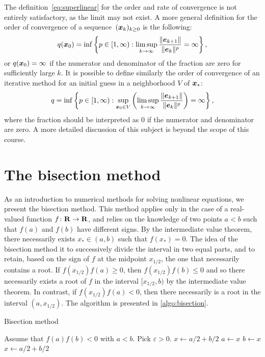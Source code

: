 \begin{remark}
    The definition~\eqref{eq:superlinear} for the order and rate of convergence is not entirely satisfactory,
    as the limit may not exist.
    A more general definition for the order of convergence of a sequence~$(\mathbf{\boldsymbol{x}}_k)_{k\geq0}$ is the following:
    \[
        q(\mathbf{\boldsymbol{x}}_0) = \inf \left\{ p \in [1, \infty) : \limsup_{k \to \infty} \frac{\lVert\mathbf{\boldsymbol{e}}_{k+1}\rVert}{\lVert\mathbf{\boldsymbol{e}}_k\rVert^p} = \infty \right\},
    \]
    or $q(\mathbf{\boldsymbol{x}}_0) = \infty$ if the numerator and denominator of the fraction are zero for sufficiently large $k$.
    It is possible to define similarly the order of convergence of an iterative method
    for an initial guess in a neighborhood $V$ of $\mathbf{\boldsymbol{x}}_*$:
    \[
        q = \inf \left\{ p \in [1, \infty) : \sup_{\mathbf{\boldsymbol{x}}_0 \in V} \left( \limsup_{k \to \infty} \frac{\lVert\mathbf{\boldsymbol{e}}_{k+1}\rVert}{\lVert\mathbf{\boldsymbol{e}}_k\rVert^p} \right) = \infty \right\},
    \]
    where the fraction should be interpreted as 0 if the numerator and denominator are zero.
    A more detailed discussion of this subject is beyond the scope of this course.
\end{remark}

\section{The bisection method}
As an introduction to numerical methods for solving nonlinear equations,
we present the bisection method.
This method applies only in the case of a real-valued function $f\colon \mathbf R \to \mathbf R$,
and relies on the knowledge of two points $a < b$ such that $f(a)$ and $f(b)$ have different signs.
By the intermediate value theorem,
there necessarily exists $x_* \in (a, b)$ such that $f(x_*) = 0$.
The idea of the bisection method it to successively divide the interval in two equal parts,
and to retain, based on the sign of $f$ at the midpoint $x_{1/2}$,
the one that necessarily contains a root.
If $f(x_{1/2}) f(a) \geq 0$, then $f(x_{1/2}) f(b) \leq 0$ and so there necessarily exists a root of $f$ in the interval $[x_{1/2}, b)$ by the intermediate value theorem.
In contrast, if $f(x_{1/2}) f(a) < 0$, then there necessarily is a root in the interval $(a, x_{1/2})$.
The algorithm is presented in \cref{algo:bisection}.
\begin{algorithm}
\caption{Bisection method}%
\label{algo:bisection}%
\begin{algorithmic}
\State Assume that $f(a) f(b) < 0$ with $a < b$.
\State Pick $\varepsilon > 0$.
\State $x \gets a/2 + b/2$
        \State $a \gets x$
    \Else
        \State $b \gets x$
    \EndIf
    \State $x \gets a/2 + b/2$
\EndWhile
\end{algorithmic}
\end{algorithm}


